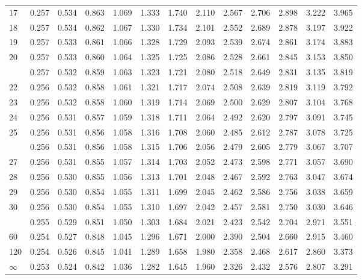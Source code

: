 \documentclass[
]{article}
\begin{document}
\begin{table}[H]
\begin{tabular}{lrrrrrrrrrrrr}
17 & 0.257 & 0.534 & 0.863 & 1.069 & 1.333 & 1.740 & 2.110 & 2.567 & 2.706 & 2.898 & 3.222 & 3.965\\
18 & 0.257 & 0.534 & 0.862 & 1.067 & 1.330 & 1.734 & 2.101 & 2.552 & 2.689 & 2.878 & 3.197 & 3.922\\
19 & 0.257 & 0.533 & 0.861 & 1.066 & 1.328 & 1.729 & 2.093 & 2.539 & 2.674 & 2.861 & 3.174 & 3.883\\
20 & 0.257 & 0.533 & 0.860 & 1.064 & 1.325 & 1.725 & 2.086 & 2.528 & 2.661 & 2.845 & 3.153 & 3.850\\
\addlinespace
21 & 0.257 & 0.532 & 0.859 & 1.063 & 1.323 & 1.721 & 2.080 & 2.518 & 2.649 & 2.831 & 3.135 & 3.819\\
22 & 0.256 & 0.532 & 0.858 & 1.061 & 1.321 & 1.717 & 2.074 & 2.508 & 2.639 & 2.819 & 3.119 & 3.792\\
23 & 0.256 & 0.532 & 0.858 & 1.060 & 1.319 & 1.714 & 2.069 & 2.500 & 2.629 & 2.807 & 3.104 & 3.768\\
24 & 0.256 & 0.531 & 0.857 & 1.059 & 1.318 & 1.711 & 2.064 & 2.492 & 2.620 & 2.797 & 3.091 & 3.745\\
25 & 0.256 & 0.531 & 0.856 & 1.058 & 1.316 & 1.708 & 2.060 & 2.485 & 2.612 & 2.787 & 3.078 & 3.725\\
\addlinespace
26 & 0.256 & 0.531 & 0.856 & 1.058 & 1.315 & 1.706 & 2.056 & 2.479 & 2.605 & 2.779 & 3.067 & 3.707\\
27 & 0.256 & 0.531 & 0.855 & 1.057 & 1.314 & 1.703 & 2.052 & 2.473 & 2.598 & 2.771 & 3.057 & 3.690\\
28 & 0.256 & 0.530 & 0.855 & 1.056 & 1.313 & 1.701 & 2.048 & 2.467 & 2.592 & 2.763 & 3.047 & 3.674\\
29 & 0.256 & 0.530 & 0.854 & 1.055 & 1.311 & 1.699 & 2.045 & 2.462 & 2.586 & 2.756 & 3.038 & 3.659\\
30 & 0.256 & 0.530 & 0.854 & 1.055 & 1.310 & 1.697 & 2.042 & 2.457 & 2.581 & 2.750 & 3.030 & 3.646\\
\addlinespace
40 & 0.255 & 0.529 & 0.851 & 1.050 & 1.303 & 1.684 & 2.021 & 2.423 & 2.542 & 2.704 & 2.971 & 3.551\\
60 & 0.254 & 0.527 & 0.848 & 1.045 & 1.296 & 1.671 & 2.000 & 2.390 & 2.504 & 2.660 & 2.915 & 3.460\\
120 & 0.254 & 0.526 & 0.845 & 1.041 & 1.289 & 1.658 & 1.980 & 2.358 & 2.468 & 2.617 & 2.860 & 3.373\\
$\infty$ & 0.253 & 0.524 & 0.842 & 1.036 & 1.282 & 1.645 & 1.960 & 2.326 & 2.432 & 2.576 & 2.807 & 3.291\\
\bottomrule
\end{tabular}
\end{table}
\end{document}
